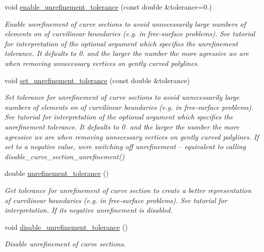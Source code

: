 \begin{DoxyCompactItemize}
void \hyperlink{classoomph_1_1TriangleMeshCurveSection_ac01b9768242eee89888b3cf1960ab226}{enable\+\_\+unrefinement\+\_\+tolerance} (const double \&tolerance=0.)
\begin{DoxyCompactList}\small\item\em Enable unrefinement of curve sections to avoid unnecessarily large numbers of elements on of curvilinear boundaries (e.\+g. in free-\/surface problems). See tutorial for interpretation of the optional argument which specifies the unrefinement tolerance. It defaults to 0. and the larger the number the more agressive we are when removing unnecessary vertices on gently curved polylines. \end{DoxyCompactList}\item 
void \hyperlink{classoomph_1_1TriangleMeshCurveSection_a2e586bbd0adf5f5f9b5cb4ed4300614a}{set\+\_\+unrefinement\+\_\+tolerance} (const double \&tolerance)
\begin{DoxyCompactList}\small\item\em Set tolerance for unrefinement of curve sections to avoid unnecessarily large numbers of elements on of curvilinear boundaries (e.\+g. in free-\/surface problems). See tutorial for interpretation of the optional argument which specifies the unrefinement tolerance. It defaults to 0. and the larger the number the more agressive we are when removing unnecessary vertices on gently curved polylines. If set to a negative value, we\textquotesingle{}re switching off unrefinement -- equivalent to calling disable\+\_\+curve\+\_\+section\+\_\+unrefinement() \end{DoxyCompactList}\item 
double \hyperlink{classoomph_1_1TriangleMeshCurveSection_a15fbe0b2d7ed1ed7a8e8f0ae10669e26}{unrefinement\+\_\+tolerance} ()
\begin{DoxyCompactList}\small\item\em Get tolerance for unrefinement of curve section to create a better representation of curvilinear boundaries (e.\+g. in free-\/surface problems). See tutorial for interpretation. If it\textquotesingle{}s negative unrefinement is disabled. \end{DoxyCompactList}\item 
void \hyperlink{classoomph_1_1TriangleMeshCurveSection_a9b79446585f07f7c375c64874f847287}{disable\+\_\+unrefinement\+\_\+tolerance} ()
\begin{DoxyCompactList}\small\item\em Disable unrefinement of curve sections. \end{DoxyCompactList}\item 

\end{DoxyCompactItemize}
